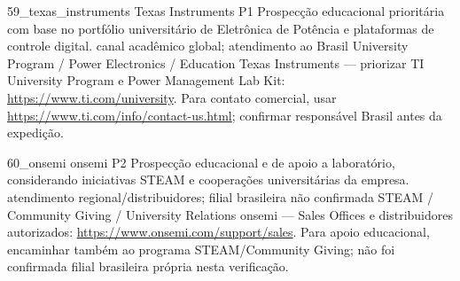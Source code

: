 \ContatoEmpresa
  {59_texas_instruments}
  {Texas Instruments}
  {P1}
  {Prospecção educacional prioritária com base no portfólio universitário de Eletrônica de Potência e plataformas de controle digital.}
  {canal acadêmico global; atendimento ao Brasil}
  {University Program / Power Electronics / Education}
  {Texas Instruments — priorizar TI University Program e Power Management Lab Kit: \url{https://www.ti.com/university}. Para contato comercial, usar \url{https://www.ti.com/info/contact-us.html}; confirmar responsável Brasil antes da expedição.}

\ContatoEmpresa
  {60_onsemi}
  {onsemi}
  {P2}
  {Prospecção educacional e de apoio a laboratório, considerando iniciativas STEAM e cooperações universitárias da empresa.}
  {atendimento regional/distribuidores; filial brasileira não confirmada}
  {STEAM / Community Giving / University Relations}
  {onsemi — Sales Offices e distribuidores autorizados: \url{https://www.onsemi.com/support/sales}. Para apoio educacional, encaminhar também ao programa STEAM/Community Giving; não foi confirmada filial brasileira própria nesta verificação.}

